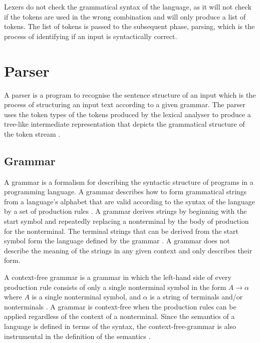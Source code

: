 Lexers do not check the grammatical syntax of the language, as it will not check if the tokens are used in the wrong combination and will only produce a list of tokens. The list of tokens is passed to the subsequent phase, parsing, which is the process of identifying if an input is syntactically correct. 

\section{Parser}

A parser is a program to recognise the sentence structure of an input which is the process of structuring an input text according to a given grammar. The parser uses the token types of the tokens produced by the lexical analyser to produce a tree-like intermediate representation that depicts the grammatical structure of the token stream \cite{aho2003compilers}.

\subsection{Grammar}

A grammar is a formalism for describing the syntactic structure of programs in a programming language. A grammar describes how to form grammatical strings from a language's alphabet that are valid according to the syntax of the language by a set of production rules \cite{meduna2014formal}. A grammar derives strings by beginning with the start symbol and repeatedly replacing a nonterminal by the body of production for the nonterminal. The terminal strings that can be derived from the start symbol form the language defined by the grammar \cite{aho2003compilers}. A grammar does not describe the meaning of the strings in any given context and only describes their form.\newline \par

A context-free grammar is a grammar in which the left-hand side of every production rule consists of only a single nonterminal symbol in the form $ A \rightarrow \alpha$ where $A$ is a single nonterminal symbol, and $\alpha$ is a string of terminals and/or nonterminals \cite{aho1971translations}. A grammar is context-free when the production rules can be applied regardless of the context of a nonterminal. Since the semantics of a language is defined in terms of the syntax, the context-free-grammar is also instrumental in the definition of the semantics \cite{grune2012modern}. \newline \par

